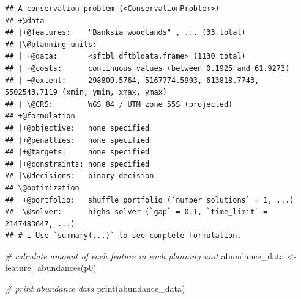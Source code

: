 \documentclass[
  12pt,
]{book}
\newenvironment{Shaded}{\begin{snugshade}}{\end{snugshade}}
\newcommand{\CommentTok}[1]{\textcolor[rgb]{0.56,0.35,0.01}{\textit{#1}}}
\newcommand{\FunctionTok}[1]{\textcolor[rgb]{0.00,0.00,0.00}{#1}}
\newcommand{\NormalTok}[1]{#1}
\newcommand{\OtherTok}[1]{\textcolor[rgb]{0.56,0.35,0.01}{#1}}
\begin{document}
\begin{verbatim}
## A conservation problem (<ConservationProblem>)
## +@data
## |+@features:    "Banksia woodlands" , ... (33 total)
## |\@planning units:
## | +@data:       <sftbl_dftbldata.frame> (1130 total)
## | +@costs:      continuous values (between 0.1925 and 61.9273)
## | +@extent:     298809.5764, 5167774.5993, 613818.7743, 5502543.7119 (xmin, ymin, xmax, ymax)
## | \@CRS:        WGS 84 / UTM zone 55S (projected)
## +@formulation
## |+@objective:   none specified
## |+@penalties:   none specified
## |+@targets:     none specified
## |+@constraints: none specified
## |\@decisions:   binary decision
## \@optimization
##  +@portfolio:   shuffle portfolio (`number_solutions` = 1, ...)
##  \@solver:      highs solver (`gap` = 0.1, `time_limit` = 2147483647, ...)
## # i Use `summary(...)` to see complete formulation.
\end{verbatim}

\begin{Shaded}
\begin{Highlighting}[]
\CommentTok{\# calculate amount of each feature in each planning unit}
\NormalTok{abundance\_data }\OtherTok{\textless{}{-}} \FunctionTok{feature\_abundances}\NormalTok{(p0)}

\CommentTok{\# print abundance data}
\FunctionTok{print}\NormalTok{(abundance\_data)}
\end{Highlighting}
\end{Shaded}
\end{document}
